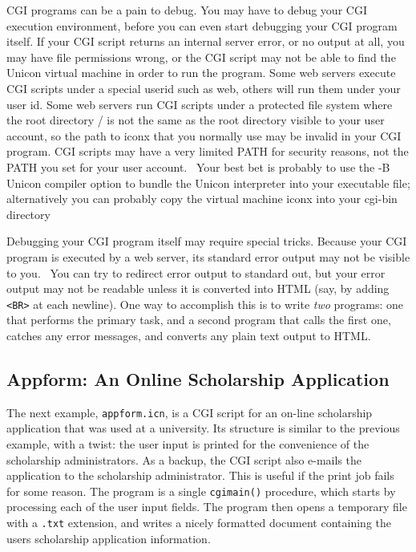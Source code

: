 {CGI programs can be a pain to debug. You may have to debug your CGI
execution environment, before you can even start debugging your CGI
program itself. If your CGI script returns an {\textquotedbl}internal
server error{\textquotedbl}, or no output at all, you may have file
permissions wrong, or the CGI script may not be able to find the Unicon
virtual machine in order to run the program. Some web servers execute
CGI scripts under a special userid such as
{\textquotedbl}web{\textquotedbl}, others will run them under your user
id. Some web servers run CGI scripts under a protected file system
where the root directory {\textquotedbl}/{\textquotedbl} is not the
same as the root directory visible to your user account, so the path to
iconx that you normally use may be invalid in your CGI program. CGI
scripts may have a very limited PATH for security reasons, not the PATH
you set for your user account. \ Your best bet is probably to use the
-B Unicon compiler option to bundle the Unicon interpreter into your
executable file; alternatively you can probably copy the virtual
machine {\textquotedbl}iconx{\textquotedbl} into your cgi-bin directory

Debugging your CGI program itself may require special tricks. Because
your CGI program is executed by a web server, its standard error output
may not be visible to you. \ You can try to redirect error output to
standard out, but your error output may not be readable unless it is
converted into HTML (say, by adding
\texttt{{\textless}BR{\textgreater}} at each newline). One way to
accomplish this is to write \textit{two} programs: one that performs
the primary task, and a second program that calls the first one,
catches any error messages, and converts any plain text output to HTML.

\subsection{Appform: An Online Scholarship Application}

The next example, \texttt{appform.icn}, is a CGI script for an
on-line scholarship application that was used at a university. Its
structure is similar to the previous example, with a twist:
the user input is printed for the convenience of the scholarship
administrators. As a backup, the CGI script also e-mails the
application to the scholarship administrator. This is useful if the
print job fails for some reason.
The program is a single \texttt{cgimain()} procedure, which starts by
processing each of the user input fields. The program then opens a
temporary file with a \texttt{.txt} extension, and writes a nicely
formatted document containing the user{\textquotesingle}s scholarship
application information.

}
